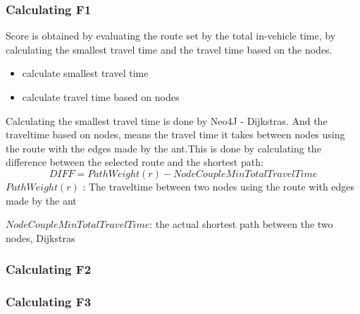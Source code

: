 \subsubsection{Calculating F1}
Score is obtained by evaluating the route set by the total in-vehicle time, by calculating the smallest travel time and the travel time based on the nodes.
\begin{itemize}
\item calculate smallest travel time
\item calculate travel time based on nodes
\end{itemize}

Calculating the smallest travel time is done by Neo4J - Dijkstras. 
And the traveltime based on nodes, means the travel time it takes between nodes using the route with the edges made by the ant.This is done by calculating the difference between the selected route and the shortest path:
$$ DIFF = PathWeight(r) - NodeCoupleMinTotalTravelTime$$
$ PathWeight(r)$ : The traveltime between two nodes using the route with edges made by the ant
\par 
$ NodeCoupleMinTotalTravelTime$: the actual shortest path between the two nodes, Dijkstras




\subsubsection{Calculating F2}
\subsubsection{Calculating F3}

